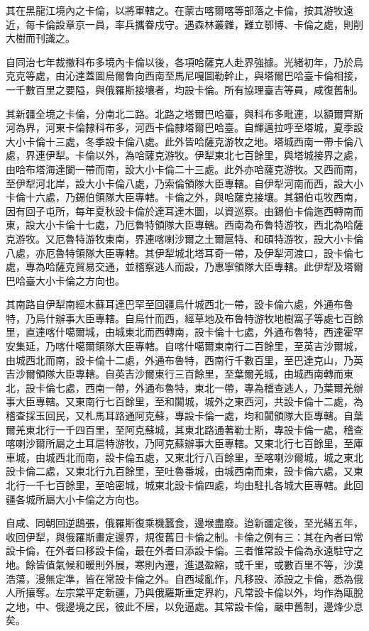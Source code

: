 \begin{pinyinscope}
其在黑龍江境內之卡倫，以將軍轄之。在蒙古喀爾喀等部落之卡倫，按其游牧遠近，每卡倫設章京一員，率兵攜眷戍守。遇森林叢雜，難立鄂博、卡倫之處，則削大樹而刊識之。

自同治七年裁撤科布多境內卡倫以後，各項哈薩克人赴界強據。光緒初年，乃於烏克克等處，由沁達蓋圖烏爾魯向西南至馬尼嘎圖勒幹止，與塔爾巴哈臺卡倫相接，一千數百里之要隘，與俄羅斯接壤者，均設卡倫。所有協理臺吉等員，咸復舊制。

其新疆全境之卡倫，分南北二路。北路之塔爾巴哈臺，與科布多毗連，以額爾齊斯河為界，河東卡倫隸科布多，河西卡倫隸塔爾巴哈臺。自輝邁拉呼至塔城，夏季設大小卡倫十三處，冬季設卡倫八處。此外皆哈薩克游牧之地。塔城西南一帶卡倫八處，界連伊犁。卡倫以外，為哈薩克游牧。伊犁東北七百餘里，與塔城接界之處，由哈布塔海達闌一帶而南，設大小卡倫二十三處。此外亦哈薩克游牧。又西而南，至伊犁河北岸，設大小卡倫八處，乃索倫領隊大臣專轄。自伊犁河南而西，設大小卡倫十六處，乃錫伯領隊大臣專轄。卡倫之外，與哈薩克接壤。其錫伯屯牧西南，因有回子屯所，每年夏秋設卡倫於達耳達木圖，以資巡察。由錫伯卡倫迤西轉南而東，設大小卡倫十七處，乃厄魯特領隊大臣專轄。西南為布魯特游牧，西北為哈薩克游牧。又厄魯特游牧東南，界連喀喇沙爾之土爾扈特、和碩特游牧，設大小卡倫八處，亦厄魯特領隊大臣專轄。其伊犁城北塔耳奇一帶，及伊犁河渡口，設卡倫七處，專為哈薩克貿易交通，並稽察逃人而設，乃惠寧領隊大臣專轄。此伊犁及塔爾巴哈臺大小卡倫之方向也。

其南路自伊犁南經木蘇耳達巴罕至回疆烏什城西北一帶，設卡倫六處，外通布魯特，乃烏什辦事大臣專轄。自烏什而西，經草地及布魯特游牧地樹窩子等處七百餘里，直達喀什噶爾城，由城東北而西轉南，設卡倫十七處，外通布魯特，西達霍罕安集延，乃喀什噶爾領隊大臣專轄。自喀什噶爾東南行二百餘里，至英吉沙爾城，由城西北而南，設卡倫十二處，外通布魯特，西南行千數百里，至巴達克山，乃英吉沙爾領隊大臣專轄。自英吉沙爾東行三百餘里，至葉爾羌城，由城西南轉而東北，設卡倫七處，西南一帶，外通布魯特，東北一帶，專為稽查逃人，乃葉爾羌辦事大臣專轄。又東南行七百餘里，至和闐城，城外之東西河，共設卡倫十二處，為稽查採玉回民，又札馬耳路通阿克蘇，專設卡倫一處，均和闐領隊大臣專轄。自葉爾羌東北行一千四百里，至阿克蘇城，其東北路通著勒士斯，專設卡倫一處，稽查喀喇沙爾所屬之土耳扈特游牧，乃阿克蘇辦事大臣專轄。又東北行七百餘里，至庫車城，由城西北而南，設卡倫五處，又東北行八百餘里，至喀喇沙爾城，城之東北設卡倫二處，又東北行九百餘里，至吐魯番城，由城西南而東，設卡倫六處，又東北行一千七百餘里，至哈密城，城東北設卡倫四處，均由駐扎各城大臣專轄。此回疆各城所屬大小卡倫之方向也。

自咸、同朝回逆鴟張，俄羅斯復乘機蠶食，邊堠盡廢。迨新疆定後，至光緒五年，收回伊犁，與俄羅斯畫定邊界，規復舊日卡倫之制。卡倫之例有三：其在內者曰常設卡倫，在外者曰移設卡倫，最在外者曰添設卡倫。三者惟常設卡倫為永遠駐守之地。餘皆值氣候和暖則外展，寒則內遷，進退盈縮，或千里，或數百里不等，沙漠浩蕩，漫無定準，皆在常設卡倫之外。自西域亂作，凡移設、添設之卡倫，悉為俄人所攘奪。左宗棠平定新疆，乃與俄羅斯重定界約，凡常設卡倫以外，均作為甌脫之地，中、俄邊境之民，彼此不居，以免逼處。其常設卡倫，嚴申舊制，邊烽少息矣。


\end{pinyinscope}

